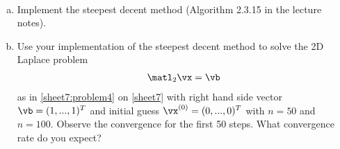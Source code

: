 \begin{Sheet}
  \begin{Problem}[Programming]
    \hfill\\\vspace{-6ex}
    \begin{enumerate}[(a)]
    \item Implement the steepest decent method (Algorithm 2.3.15 in the
      lecture notes).
    \item Use your implementation of the steepest decent method to
      solve the 2D Laplace problem
      \begin{gather*}
        \matl_2\vx=\vb
      \end{gather*}
      as in \cref{sheet7:problem4} on \cref{sheet7} with right hand
      side vector $\vb=(1,...,1)^T$ and initial guess
      $\vx^{(0)}=(0,...,0)^T$ with $n=50$ and $n=100$. Observe the
      convergence for the first 50 steps. What convergence rate do you
      expect?
    \end{enumerate}
  \end{Problem}

  \vfill
  
  

\end{Sheet}


